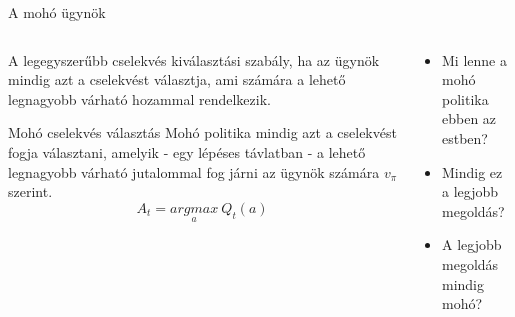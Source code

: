 \documentclass[english, aspectratio=169]{beamer}
\begin{document}
\begin{frame}{A mohó ügynök}
\begin{columns}[T]
\begin{column}{.5\textwidth}
A legegyszerűbb cselekvés kiválasztási szabály, ha az ügynök mindig azt a cselekvést választja, ami számára a lehető legnagyobb várható hozammal rendelkezik.
\begin{center}
\begin{block}{Mohó cselekvés választás}
Mohó politika mindig azt a cselekvést fogja választani, amelyik - egy lépéses távlatban - a lehető legnagyobb várható jutalommal fog járni az ügynök számára $v_{\pi}$ szerint.
\[
A_{t}=\underset{a}{argmax}\:Q_{t}(a)
\]
\end{block}
\end{center}
\end{column}
\begin{column}{.5\textwidth}
\begin{itemize}
	\item Mi lenne a mohó politika ebben az estben?
	\item Mindig ez a legjobb megoldás?
	\item A legjobb megoldás mindig mohó?
\end{itemize}
\begin{center}
\end{center}
\end{column}
\end{columns}
\end{frame}
\end{document}

